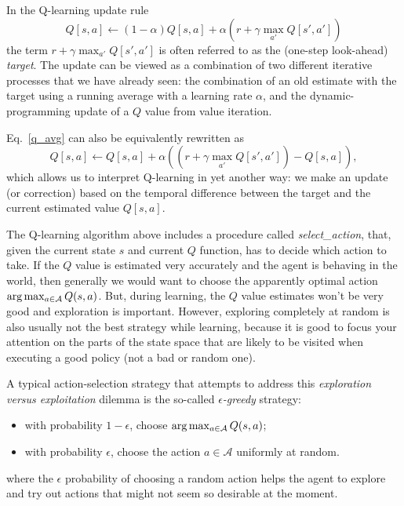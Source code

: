 In the Q-learning update rule
\begin{equation}\label{q_avg}
  Q[s, a] \leftarrow (1-\alpha)Q[s, a]
  + \alpha(r + \gamma \max_{a'}Q[s',a'])
\end{equation}
the term $r + \gamma \max_{a'} Q[s',a']$ is often referred to as the
(one-step look-ahead) \emph{target}. The update can be viewed as a
combination of two different iterative processes that we have already
seen: the combination of an old estimate with the target using a
running average with a learning rate $\alpha$, and the
dynamic-programming update of a $Q$ value from value iteration.


Eq.~\ref{q_avg} can also be equivalently rewritten as
\begin{equation}\label{td:q}
  Q[s, a] \leftarrow Q[s, a]
  + \alpha\left((r + \gamma \max_{a'}
  Q[s',a'])-Q[s,a]\right),
\end{equation}
which allows us to interpret Q-learning in yet another way: we make an
update (or correction) based on the temporal difference between the
target and the current estimated value $Q[s, a].$





The Q-learning algorithm above includes a procedure called {\it select\_action},
that, given the current state $s$ and current $Q$ function, has to decide
which action to take.  If the $Q$ value is estimated very accurately
and the agent is behaving in the world, then generally we would want
to choose the apparently optimal action ${\rm arg}\max_{a \in \mathcal{A}}
  Q(s,a)$.  But, during learning, the $Q$ value estimates won't be very
good and exploration is important.  However, exploring completely at
random is also usually not the best strategy while learning, because
it is good to focus your attention on the parts of the state space
that are likely to be visited when executing a good policy (not a bad
or random one).

A typical action-selection strategy that attempts to address this
  {\em exploration versus exploitation} dilemma is the so-called {\em
$\epsilon$-greedy} strategy:
\begin{itemize}
  \item with probability $1-\epsilon$, choose
        ${\rm arg}\max_{a \in \mathcal{A}} Q(s,a)$;
  \item with probability $\epsilon$, choose the action $a \in \mathcal{A}$
        uniformly at random.
\end{itemize}
where the $\epsilon$ probability of choosing a random action helps the
agent to explore and try out actions that might not seem so desirable
at the moment.


